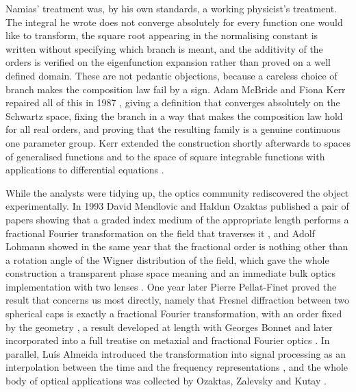 		Namias' treatment was, by his own standards, a working physicist's treatment. The integral he wrote does not converge absolutely for every function one would like to transform, the square root appearing in the normalising constant is written without specifying which branch is meant, and the additivity of the orders is verified on the eigenfunction expansion rather than proved on a well defined domain. These are not pedantic objections, because a careless choice of branch makes the composition law fail by a sign. Adam McBride and Fiona Kerr repaired all of this in 1987 \citep{mcbride1987namias}, giving a definition that converges absolutely on the Schwartz space, fixing the branch in a way that makes the composition law hold for all real orders, and proving that the resulting family is a genuine continuous one parameter group. Kerr extended the construction shortly afterwards to spaces of generalised functions \citep{kerr1988distributional} and to the space of square integrable functions with applications to differential equations \citep{kerr1988namias}.

		While the analysts were tidying up, the optics community rediscovered the object experimentally. In 1993 David Mendlovic and Haldun Ozaktas published a pair of papers showing that a graded index medium of the appropriate length performs a fractional Fourier transformation on the field that traverses it \citep{mendlovic1993fractional, ozaktas1993fractional}, and Adolf Lohmann showed in the same year that the fractional order is nothing other than a rotation angle of the Wigner distribution of the field, which gave the whole construction a transparent phase space meaning and an immediate bulk optics implementation with two lenses \citep{lohmann1993image}. One year later Pierre Pellat-Finet proved the result that concerns us most directly, namely that Fresnel diffraction between two spherical caps is exactly a fractional Fourier transformation, with an order fixed by the geometry \citep{pellatfinet1994fresnel}, a result developed at length with Georges Bonnet \citep{pellatfinet1994fractional} and later incorporated into a full treatise on metaxial and fractional Fourier optics \citep{pellatfinet2009optique}. In parallel, Lu\'is Almeida introduced the transformation into signal processing as an interpolation between the time and the frequency representations \citep{almeida1994fractional}, and the whole body of optical applications was collected by Ozaktas, Zalevsky and Kutay \citeyearpar{ozaktas2001fractional}.

